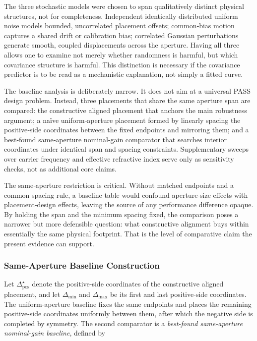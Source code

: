 The three stochastic models were chosen to span qualitatively distinct physical structures, not for completeness. Independent identically distributed uniform noise models bounded, uncorrelated placement offsets; common‑bias motion captures a shared drift or calibration bias; correlated Gaussian perturbations generate smooth, coupled displacements across the aperture. Having all three allows one to examine not merely whether randomness is harmful, but which covariance structure is harmful. This distinction is necessary if the covariance predictor is to be read as a mechanistic explanation, not simply a fitted curve.

The baseline analysis is deliberately narrow. It does not aim at a universal PASS design problem. Instead, three placements that share the same aperture span are compared: the constructive aligned placement that anchors the main robustness argument; a naïve uniform‑aperture placement formed by linearly spacing the positive‑side coordinates between the fixed endpoints and mirroring them; and a best‑found same‑aperture nominal‑gain comparator that searches interior coordinates under identical span and spacing constraints. Supplementary sweeps over carrier frequency and effective refractive index serve only as sensitivity checks, not as additional core claims.

The same‑aperture restriction is critical. Without matched endpoints and a common spacing rule, a baseline table would confound aperture‑size effects with placement‑design effects, leaving the source of any performance difference opaque. By holding the span and the minimum spacing fixed, the comparison poses a narrower but more defensible question: what constructive alignment buys within essentially the same physical footprint. That is the level of comparative claim the present evidence can support.


\subsubsection{Same-Aperture Baseline Construction}

Let $\Delta_{\mathrm{pos}}^\star$ denote the positive-side coordinates of the constructive aligned placement, and let $\Delta_{\min}$ and $\Delta_{\max}$ be its first and last positive-side coordinates. The uniform-aperture baseline fixes the same endpoints and places the remaining positive-side coordinates uniformly between them, after which the negative side is completed by symmetry. The second comparator is a \emph{best-found same-aperture nominal-gain baseline}, defined by

